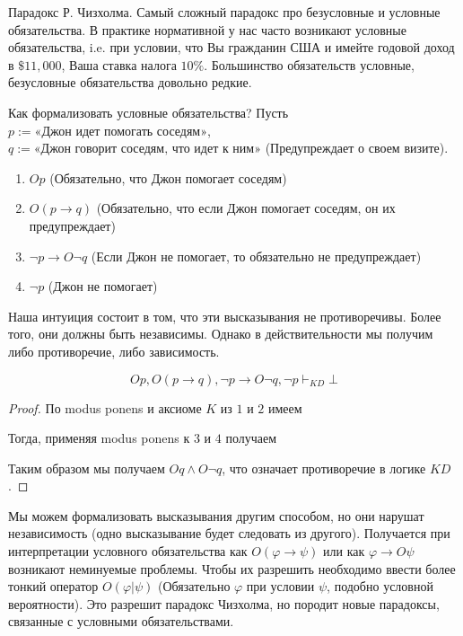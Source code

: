 \documentclass[openany]{book}
\theoremstyle{plain}
\theoremstyle{definition}
\begin{document}
Парадокс Р. Чизхолма. Самый сложный парадокс про безусловные и условные обязательства. В практике нормативной у нас часто возникают условные обязательства, i.e. при условии, что Вы гражданин США и имейте годовой доход в \(\$11,000\), Ваша ставка налога \(10\%\). Большинство обязательств условные, безусловные обязательства довольно редкие. 

Как формализовать условные обязательства? Пусть \(p := \text{«Джон идет помогать соседям»}\), \(q := \text{«Джон говорит соседям, что идет к ним»}\) (Предупреждает о своем визите).

\begin{enumerate}
\item \(O p\) (Обязательно, что Джон помогает соседям)
\item \(O (p \to q)\) (Обязательно, что если Джон помогает соседям, он их предупреждает)
\item \(\neg p \to O \neg q\) (Если Джон не помогает, то обязательно не предупреждает)
\item \(\neg p\) (Джон не помогает)
\end{enumerate}

Наша интуиция состоит в том, что эти высказывания не противоречивы. Более того, они должны быть независимы. Однако в действительности мы получим либо противоречие, либо зависимость. 

\[O p, O (p \to q), \neg p \to O \neg q, \neg p \vdash_{K D} \bot\]

\begin{proof}
По modus ponens и аксиоме \(K\) из \(1\) и \(2\) имеем

\begin{prooftree}
\end{prooftree}

Тогда, применяя modus ponens к \(3\) и \(4\) получаем

\begin{prooftree}
\end{prooftree}

Таким образом мы получаем \(O q \land O \neg q\), что означает противоречие в логике \(K D\).

\end{proof}

Мы можем формализовать высказывания другим способом, но они нарушат независимость (одно высказывание будет следовать из другого). Получается при интерпретации условного обязательства как \(O (\varphi \to \psi)\) или как \(\varphi \to O \psi\) возникают неминуемые проблемы. Чтобы их разрешить необходимо ввести более тонкий оператор \(O(\varphi | \psi)\) (Обязательно \(\varphi\) при условии \(\psi\), подобно условной вероятности). Это разрешит парадокс Чизхолма, но породит новые парадоксы, связанные с условными обязательствами. 
\end{document}
